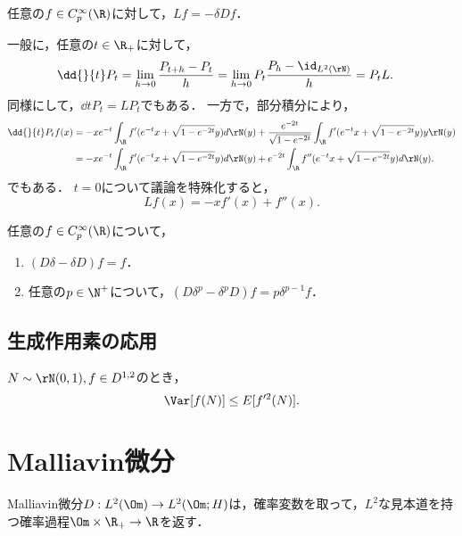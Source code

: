 \documentclass[uplatex,dvipdfmx]{jsreport}
\begin{document}
\begin{proposition}
    任意の$f\in C^\infty_p(\R)$に対して，$Lf=-\delta Df$．
\end{proposition}
\begin{Proof}
    一般に，任意の$t\in\R_+$に対して，
    \begin{align*}
        \dd{}{t}P_t&=\lim_{h\to0}\frac{P_{t+h}-P_t}{h}=\lim_{h\to0}P_t\frac{P_h-\id_{L^2(\rN)}}{h}=P_tL.
    \end{align*}
    同様にして，$\dd{}{t}P_t=LP_t$でもある．
    一方で，部分積分により，
    \begin{align*}
        \dd{}{t}P_tf(x)&=-xe^{-t}\int_\R f'(e^{-t}x+\sqrt{1-e^{-2t}}y)d\rN(y)+\frac{e^{-2t}}{\sqrt{1-e^{-2t}}}\int_\R f'(e^{-t}x+\sqrt{1-e^{-2t}}y)y\rN(y)\\
        &=-xe^{-t}\int_\R f'(e^{-t}x+\sqrt{1-e^{-2t}}y)d\rN(y)+e^{-2t}\int_\R f''(e^{-t}x+\sqrt{1-e^{-2t}}y)d\rN(y).
    \end{align*}
    でもある．
    $t=0$について議論を特殊化すると，
    \[Lf(x)=-xf'(x)+f''(x).\]
\end{Proof}

\begin{proposition}[Heisenbergの関係]
    任意の$f\in C_p^\infty(\R)$について，
    \begin{enumerate}
        \item $(D\delta-\delta D)f=f$．
        \item 任意の$p\in\N^+$について，$(D\delta^p-\delta^pD)f=p\delta^{p-1}f$．
    \end{enumerate}
\end{proposition}

\subsection{生成作用素の応用}

\begin{proposition}
    $N\sim\rN(0,1),f\in D^{1,2}$のとき，
    \[\Var[f(N)]\le E[f'^2(N)].\]
\end{proposition}

\section{Malliavin微分}

\begin{tcolorbox}[colframe=ForestGreen, colback=ForestGreen!10!white,breakable,colbacktitle=ForestGreen!40!white,coltitle=black,fonttitle=\bfseries\sffamily,
title=]
    Malliavin微分$D:L^2(\Om)\to L^2(\Om;H)$は，確率変数を取って，$L^2$な見本道を持つ確率過程$\Om\times\R_+\to\R$を返す．
\end{tcolorbox}
\end{document}
